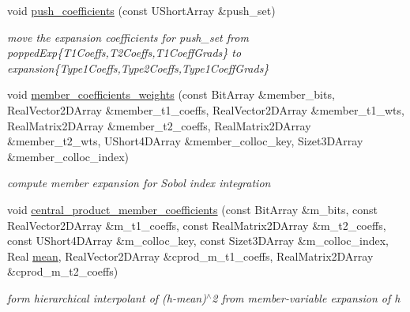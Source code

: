 \begin{DoxyCompactItemize}
void \hyperlink{classPecos_1_1HierarchInterpPolyApproximation_a85c57e8dbd99dfa66dcd11eda308432e}{push\+\_\+coefficients} (const U\+Short\+Array \&push\+\_\+set)
\begin{DoxyCompactList}\small\item\em move the expansion coefficients for push\+\_\+set from popped\+Exp\{T1\+Coeffs,T2\+Coeffs,T1\+Coeff\+Grads\} to expansion\{Type1\+Coeffs,Type2\+Coeffs,Type1\+Coeff\+Grads\} \end{DoxyCompactList}\item 
void \hyperlink{classPecos_1_1HierarchInterpPolyApproximation_a3d614c925f2689e80288a4eb4da59fcf}{member\+\_\+coefficients\+\_\+weights} (const Bit\+Array \&member\+\_\+bits, Real\+Vector2\+D\+Array \&member\+\_\+t1\+\_\+coeffs, Real\+Vector2\+D\+Array \&member\+\_\+t1\+\_\+wts, Real\+Matrix2\+D\+Array \&member\+\_\+t2\+\_\+coeffs, Real\+Matrix2\+D\+Array \&member\+\_\+t2\+\_\+wts, U\+Short4\+D\+Array \&member\+\_\+colloc\+\_\+key, Sizet3\+D\+Array \&member\+\_\+colloc\+\_\+index)
\begin{DoxyCompactList}\small\item\em compute member expansion for Sobol\textquotesingle{} index integration \end{DoxyCompactList}\item 
void \hyperlink{classPecos_1_1HierarchInterpPolyApproximation_ac10f275a789ace824cf685435e952caa}{central\+\_\+product\+\_\+member\+\_\+coefficients} (const Bit\+Array \&m\+\_\+bits, const Real\+Vector2\+D\+Array \&m\+\_\+t1\+\_\+coeffs, const Real\+Matrix2\+D\+Array \&m\+\_\+t2\+\_\+coeffs, const U\+Short4\+D\+Array \&m\+\_\+colloc\+\_\+key, const Sizet3\+D\+Array \&m\+\_\+colloc\+\_\+index, Real \hyperlink{classPecos_1_1HierarchInterpPolyApproximation_adc6f262952d05a33ff68cae37929cbb2}{mean}, Real\+Vector2\+D\+Array \&cprod\+\_\+m\+\_\+t1\+\_\+coeffs, Real\+Matrix2\+D\+Array \&cprod\+\_\+m\+\_\+t2\+\_\+coeffs)\label{classPecos_1_1HierarchInterpPolyApproximation_ac10f275a789ace824cf685435e952caa}

\begin{DoxyCompactList}\small\item\em form hierarchical interpolant of (h-\/mean)$^\wedge$2 from member-\/variable expansion of h \end{DoxyCompactList}\end{DoxyCompactItemize}
